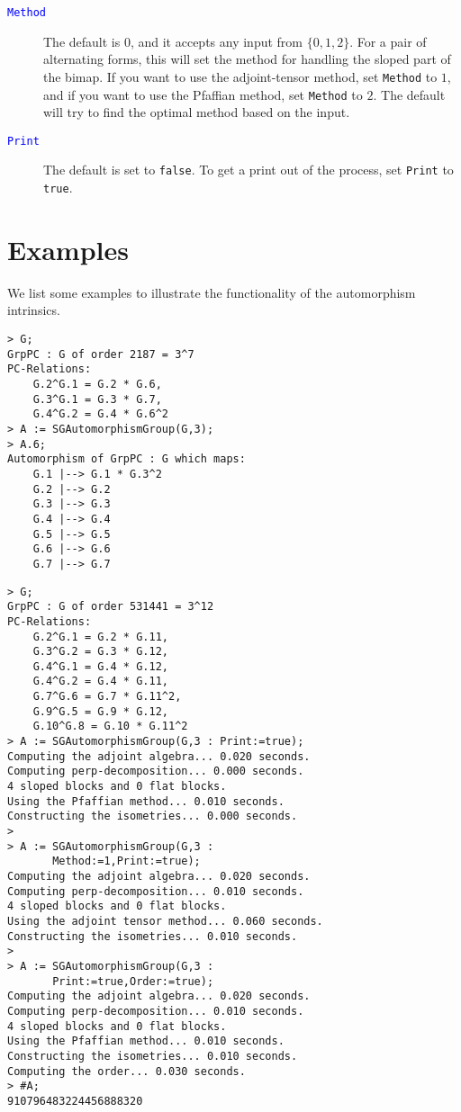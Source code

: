 \documentclass{documentation}
\begin{document}
\begin{description}
\item[\textcolor{blue}{\tt Method}]
The default is $0$, and it accepts any input from $\{ 0,1,2\}$. 
For a pair of alternating forms, this will set the method for handling the sloped part of the bimap.
If you want to use the adjoint-tensor method, set {\tt Method} to $1$, and if you want to use the Pfaffian
method, set {\tt Method} to $2$. The default will try to find the optimal method based on the input. 
\item[\textcolor{blue}{\tt Print}]
The default is set to {\tt false}. To get a print out of the process, set {\tt Print} to {\tt true}. 
\end{description}

\section{Examples}
We list some examples to illustrate the functionality of the automorphism intrinsics.

\begin{lstlisting}[frame=single,basicstyle=\ttfamily\color{black!30!teal},backgroundcolor=\color{white!70!gray}]
> G;
GrpPC : G of order 2187 = 3^7
PC-Relations:
    G.2^G.1 = G.2 * G.6, 
    G.3^G.1 = G.3 * G.7, 
    G.4^G.2 = G.4 * G.6^2
> A := SGAutomorphismGroup(G,3);
> A.6;
Automorphism of GrpPC : G which maps:
    G.1 |--> G.1 * G.3^2
    G.2 |--> G.2
    G.3 |--> G.3
    G.4 |--> G.4
    G.5 |--> G.5
    G.6 |--> G.6
    G.7 |--> G.7
\end{lstlisting}


\begin{lstlisting}[frame=single,basicstyle=\ttfamily\color{black!30!teal},backgroundcolor=\color{white!70!gray}]
> G;
GrpPC : G of order 531441 = 3^12
PC-Relations:
    G.2^G.1 = G.2 * G.11, 
    G.3^G.2 = G.3 * G.12, 
    G.4^G.1 = G.4 * G.12, 
    G.4^G.2 = G.4 * G.11, 
    G.7^G.6 = G.7 * G.11^2, 
    G.9^G.5 = G.9 * G.12, 
    G.10^G.8 = G.10 * G.11^2
> A := SGAutomorphismGroup(G,3 : Print:=true);
Computing the adjoint algebra... 0.020 seconds.
Computing perp-decomposition... 0.000 seconds.
4 sloped blocks and 0 flat blocks.
Using the Pfaffian method... 0.010 seconds.
Constructing the isometries... 0.000 seconds.
>
> A := SGAutomorphismGroup(G,3 : 
       Method:=1,Print:=true);
Computing the adjoint algebra... 0.020 seconds.
Computing perp-decomposition... 0.010 seconds.
4 sloped blocks and 0 flat blocks.
Using the adjoint tensor method... 0.060 seconds.
Constructing the isometries... 0.010 seconds.
>
> A := SGAutomorphismGroup(G,3 : 
       Print:=true,Order:=true);
Computing the adjoint algebra... 0.020 seconds.
Computing perp-decomposition... 0.010 seconds.
4 sloped blocks and 0 flat blocks.
Using the Pfaffian method... 0.010 seconds.
Constructing the isometries... 0.010 seconds.
Computing the order... 0.030 seconds.
> #A;
910796483224456888320
\end{lstlisting}
\end{document}
